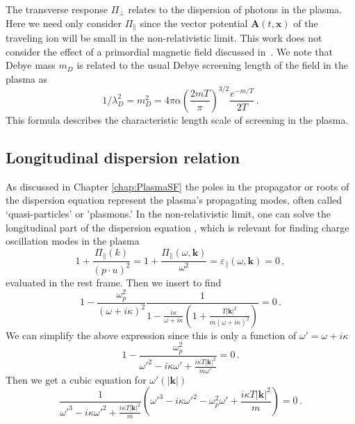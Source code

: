 The transverse response $\Pi_{\perp}$ relates to the dispersion of photons in the plasma. Here we need only consider $\Pi_\parallel$ since the vector potential $\boldsymbol{A}(t,\boldsymbol{x})$ of the traveling ion will be small in the non-relativistic limit. This work does not consider the effect of a primordial magnetic field discussed in~\cite{Steinmetz:2023abc}. We note that Debye mass $m_D$ is related to the usual Debye screening length of the field in the plasma as
\begin{equation}\label{eq:mL}
	1/\lambda_D^{2} = m_D^2= 4 \pi \alpha \left(\frac{2mT}{\pi}\right)^{3/2}\frac{e^{-m/T}}{2T}\,.
\end{equation}
This formula describes the characteristic length scale of screening in the plasma.

\subsection{Longitudinal dispersion relation}
As discussed in Chapter \ref{chap:PlasmaSF} the poles in the propagator or roots of the dispersion equation represent the plasma's propagating modes, often called `quasi-particles' or 'plasmons.' In the non-relativistic limit, one can solve the longitudinal part of the dispersion equation , which is relevant for finding charge oscillation modes in the plasma
\begin{equation}
    1+ \frac{\Pi_\parallel( k)}{(p\cdot u)^2}= 1+ \frac{\Pi_\parallel(\omega, \boldsymbol{k})}{\omega^2}=\varepsilon_\parallel(\omega,\boldsymbol{k}) =0 \,,
\end{equation}
evaluated in the rest frame. Then we insert  to find
\begin{equation}
   1- \frac{\omega_p^2}{(\omega+ i \kappa)^2} \frac{1}{1-\frac{i\kappa}{\omega+ i \kappa}\left(1+\frac{T |\boldsymbol{k}|^2}{m(\omega+ i \kappa)^2} \right)}=0 \,.
\end{equation}
We can simplify the above expression since this is only a function of $\omega' =\omega+i\kappa$
\begin{equation}
   1- \frac{\omega_p^2}{\omega'^2-i\kappa\omega'+\frac{i\kappa T |\boldsymbol{k}|^2}{m \omega'} }=0 \,.
\end{equation}
Then we get a cubic equation for $\omega'(|\boldsymbol{k}|)$
\begin{equation}\label{eq:dispfact}
   \frac{1}{\omega'^3-i\kappa\omega'^2+\frac{i\kappa T |\boldsymbol{k}|^2}{m} }
    \left(\omega'^3-i\kappa\omega'^2 - \omega_p^2\omega'+\frac{i\kappa T |\boldsymbol{k}|^2}{m} \right)=0 \,.
\end{equation}
